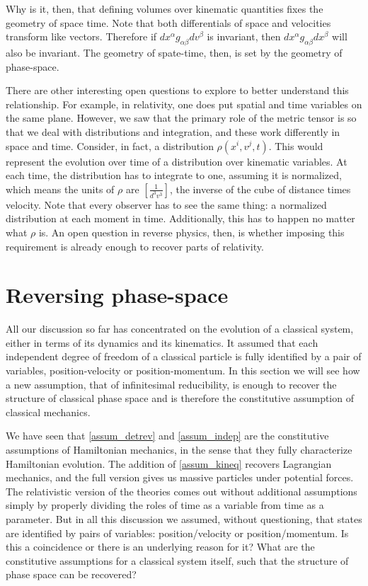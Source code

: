 Why is it, then, that defining volumes over kinematic quantities fixes the geometry of space time. Note that both differentials of space and velocities transform like vectors. Therefore if $dx^\alpha g_{\alpha\beta} dv^\beta$ is invariant, then $dx^\alpha g_{\alpha\beta} dx^\beta$ will also be invariant. The geometry of spate-time, then, is set by the geometry of phase-space.

There are other interesting open questions to explore to better understand this relationship. For example, in relativity, one does put spatial and time variables on the same plane. However, we saw that the primary role of the metric tensor is so that we deal with distributions and integration, and these work differently in space and time. Consider, in fact, a distribution $\rho(x^i, v^j, t)$. This would represent the evolution over time of a distribution over kinematic variables. At each time, the distribution has to integrate to one, assuming it is normalized, which means the units of $\rho$ are $\left[\frac{1}{d^3v^3}\right]$, the inverse of the cube of distance times velocity. Note that every observer has to see the same thing: a normalized distribution at each moment in time. Additionally, this has to happen no matter what $\rho$ is. An open question in reverse physics, then, is whether imposing this requirement is already enough to recover parts of relativity.

\section{Reversing phase-space}

All our discussion so far has concentrated on the evolution of a classical system, either in terms of its dynamics and its kinematics. It assumed that each independent degree of freedom of a classical particle is fully identified by a pair of variables, position-velocity or position-momentum. In this section we will see how a new assumption, that of infinitesimal reducibility, is enough to recover the structure of classical phase space and is therefore the constitutive assumption of classical mechanics.

We have seen that \ref{assum_detrev} and \ref{assum_indep} are the constitutive assumptions of Hamiltonian mechanics, in the sense that they fully characterize Hamiltonian evolution. The addition of \ref{assum_kineq} recovers Lagrangian mechanics, and the full version gives us massive particles under potential forces. The relativistic version of the theories comes out without additional assumptions simply by properly dividing the roles of time as a variable from time as a parameter. But in all this discussion we assumed, without questioning, that states are identified by pairs of variables: position/velocity or position/momentum. Is this a coincidence or there is an underlying reason for it? What are the constitutive assumptions for a classical system itself, such that the structure of phase space can be recovered?

